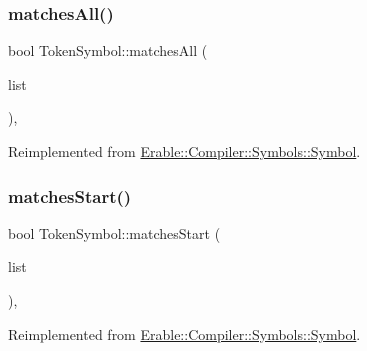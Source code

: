 \mbox{\label{class_erable_1_1_compiler_1_1_symbols_1_1_token_symbol_a89e31223762aafe7f77d545595a6e4ef}} 
\subsubsection{\texorpdfstring{matchesAll()}{matchesAll()}}
{\footnotesize\ttfamily bool Token\+Symbol\+::matches\+All (\begin{DoxyParamCaption}\item[{Data\+::\+Data\+Deque}]{list }\end{DoxyParamCaption})\hspace{0.3cm}{\ttfamily [override]}, {\ttfamily [virtual]}}



Reimplemented from \mbox{\hyperlink{class_erable_1_1_compiler_1_1_symbols_1_1_symbol_a49dd91010baf238ed0d639004c3ec9ba}{Erable\+::\+Compiler\+::\+Symbols\+::\+Symbol}}.

\mbox{\label{class_erable_1_1_compiler_1_1_symbols_1_1_token_symbol_a0bc1350eeca0c23ef97f454589734ede}} 
\subsubsection{\texorpdfstring{matchesStart()}{matchesStart()}}
{\footnotesize\ttfamily bool Token\+Symbol\+::matches\+Start (\begin{DoxyParamCaption}\item[{Data\+::\+Data\+Deque}]{list }\end{DoxyParamCaption})\hspace{0.3cm}{\ttfamily [override]}, {\ttfamily [virtual]}}



Reimplemented from \mbox{\hyperlink{class_erable_1_1_compiler_1_1_symbols_1_1_symbol_a108a4a3e9b9a2785f14ed580e813a52a}{Erable\+::\+Compiler\+::\+Symbols\+::\+Symbol}}.

